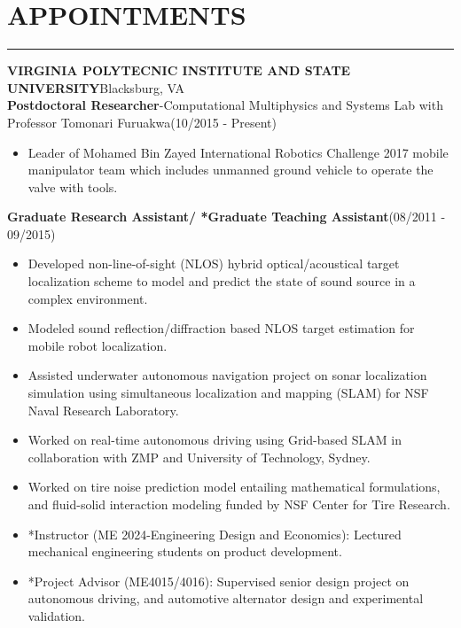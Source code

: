 \documentclass[11pt,letterpaper]{article}
\begin{document}
\section*{APPOINTMENTS}\vspace{-3mm}
\hrule
\MakeUppercase{\bf Virginia Polytecnic Institute and State University}\hfill{Blacksburg, VA }\\
{\bfseries Postdoctoral Researcher}-Computational Multiphysics and Systems Lab with Professor Tomonari Furuakwa\hfill{(10/2015 - Present)}\\
\begin{itemize}
	\item Leader of Mohamed Bin Zayed International Robotics Challenge 2017 mobile manipulator team which includes unmanned ground vehicle to operate the valve with tools. 
\end{itemize}
{\bfseries Graduate Research Assistant/ *Graduate Teaching Assistant}\hfill {(08/2011 - 09/2015)}\\
\begin{itemize}
\item Developed non-line-of-sight (NLOS) hybrid optical/acoustical target localization scheme to model and predict the state of sound source in a complex environment.
\item Modeled sound reflection/diffraction based NLOS target estimation for mobile robot localization.
\item Assisted underwater autonomous navigation project on sonar localization simulation using simultaneous localization and mapping (SLAM) for NSF Naval Research Laboratory.
\item Worked on real-time autonomous driving using Grid-based SLAM in collaboration with ZMP and University of Technology, Sydney.
\item Worked on tire noise prediction model entailing mathematical formulations, and fluid-solid interaction modeling funded by NSF Center for Tire Research.
\item *Instructor (ME 2024-Engineering Design and Economics): Lectured mechanical engineering students on product development.
\item *Project Advisor (ME4015/4016): Supervised senior design project on autonomous driving, and automotive alternator design and experimental validation. 
\end{itemize}
\end{document}
